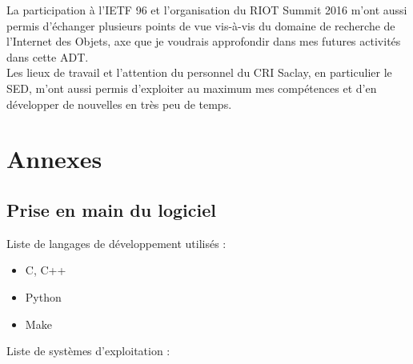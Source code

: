 \documentclass[a4paper, twoside]{article}
\newenvironment{notes}[0]{\color{blue}}{\color{black}}
\begin{document}
La participation à l'IETF 96 et l'organisation du RIOT Summit 2016 m'ont aussi permis d'échanger plusieurs points de vue vis-à-vis du domaine de recherche de l'Internet des Objets, axe que je voudrais approfondir dans mes futures activités dans cette ADT.\\

Les lieux de travail et l'attention du personnel du CRI Saclay, en particulier
le SED, m'ont aussi permis d'exploiter au maximum mes compétences et d'en
développer de nouvelles en très peu de temps.







\section{Annexes}

\subsection{Prise en main du logiciel}
Liste de langages de développement utilisés :

\begin{itemize}
	\item C, C++
	\item Python
	\item Make\\
\end{itemize}

Liste de systèmes d'exploitation :
\end{document}
